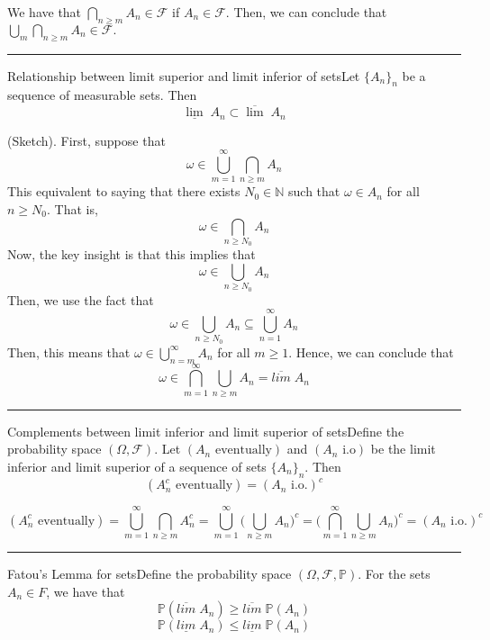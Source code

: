 \documentclass[twoside]{article}
\newenvironment{proof}{{\bf Proof:}}{\hfill\rule{2mm}{2mm}}
\newcommand{\sigmalgebra}{\mathcal{F}}
\newcommand{\prob}{\mathbb{P}}
\begin{document}
\begin{proof} We have that $\bigcap_{n \geq m}A_n \in \sigmalgebra$ if $A_n \in \sigmalgebra$. Then, we can conclude that $\bigcup_m\bigcap_{n \geq m}A_n \in \sigmalgebra.$
\end{proof}

\begin{proposition_exam}{Relationship between limit superior and limit inferior of sets}{}Let $\{A_n\}_n$ be a sequence of measurable sets. Then 
$$
\underline{\lim} \;A_n  \subset \overline{\lim} \;A_n
$$
\end{proposition_exam}

\begin{proof}(Sketch). First, suppose that 
$$
\omega \in \bigcup_{m = 1}^{\infty}\bigcap_{n \geq m}A_n
$$
This equivalent to saying that there exists $N_0 \in \mathbb{N}$ such that $\omega \in A_n$ for all $n \geq N_0.$ That is,
$$
\omega \in \bigcap_{n \geq N_0}A_n
$$
Now, the key insight is that this implies that 
$$
\omega \in \bigcup_{n \geq N_0}A_n
$$
Then, we use the fact that 
$$
\omega \in \bigcup_{n \geq N_0}A_n \subseteq \bigcup_{n = 1}^{\infty}A_n
$$
Then, this means that $
\omega \in \bigcup_{n = m}^{\infty}A_n
$
 for all $m \geq 1.$ Hence, we can conclude that 
$$
\omega \in \bigcap_{m = 1}^{\infty}\bigcup_{n \geq m}A_n = \overline{lim}\;A_n
$$
\end{proof}

\begin{proposition_exam}{Complements between limit inferior and limit superior of sets}{}Define the probability space $(\Omega, \sigmalgebra).$ Let $(A_n \text{ eventually})$ and $(A_n \text{ i.o})$ be the limit inferior and limit superior of a sequence of sets $\{A_n\}_n$. Then 
$$
(A_n^c \text{ eventually}) = (A_n \text{ i.o.})^c
$$
\end{proposition_exam}
\begin{proof}
$$
(A_n^c \text{ eventually}) = \bigcup_{m = 1}^{\infty}\bigcap_{n \geq m}A_n^c = \bigcup_{m = 1}^{\infty}\bigg(\bigcup_{n \geq m}A_n\bigg)^c = \bigg(\bigcap_{m = 1}^{\infty}\bigcup_{n \geq m}A_n\bigg)^c = (A_n \text{ i.o.})^c
$$
\end{proof}


\begin{theorem_exam}{Fatou's Lemma for sets}{}Define the probability space $(\Omega, \sigmalgebra, \prob).$ For the sets $A_n \in F$, we have that
$$
\prob(\overline{lim}\;A_n) \geq \overline{lim}\;\prob(A_n)
$$
$$
\prob(\underline{lim}\;A_n) \leq \underline{lim}\;\prob(A_n) 
$$
\end{theorem_exam}
\end{document}
